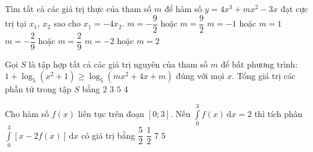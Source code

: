 \begin{ex}%
Tìm tất cả các giá trị thực của tham số $m$ để hàm số $y=4x^{3}+mx^{2}-3x$ đạt cực trị tại $x_{1}$, $x_{2}$ sao cho $x_{1}=-4x_{2}$.
\choice
{\True $m=-\dfrac{9}{2}$ hoặc $m=\dfrac{9}{2}$}  
{$m=-1$ hoặc $m=1$}  
{$m=-\dfrac{2}{9}$ hoặc $m=\dfrac{2}{9}$}  
{$m=-2$ hoặc $m=2$}
\end{ex}

\begin{ex}%
Gọi $S$ là tập hợp tất cả các giá trị nguyên của tham số $m$ để bất phương trình: 
 $1+\log_{5}\left(x^{2}+1\right)\ge\log_{5}\left(mx^{2}+4x+m\right)$  đúng với mọi $x$. Tổng giá trị các phần tử trong tập $S$ bằng
\choice
{$2$}  
{\True $3$}  
{$5$}  
{$4$}
\end{ex}

\begin{ex}%
Cho hàm số $f(x)$ liên tục trên đoạn $[0;3]$. Nếu $\displaystyle\int\limits_0^3f(x)\mathrm{\,d}x=2$ thì tích phân $\displaystyle\int\limits_{0}^{3}\left[x-2f(x) \right]\mathrm{\,d}x$ có giá trị bằng
\choice
{$\dfrac{5}{2}$}  
{\True $\dfrac{1}{2}$}  
{$7$}  
{$5$}
\end{ex}

